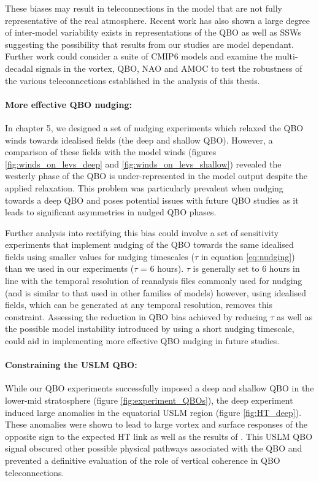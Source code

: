 These biases may result in teleconnections in the model that are not fully representative of the real atmosphere. Recent work has also shown a large degree of inter-model variability exists in representations of the QBO \citep{bushellEvaluation2020b} as well as SSWs \citep{ayarzaguenaUncertainty2020b} suggesting the possibility that results from our studies are model dependant. Further work could consider a suite of CMIP6 models and examine the multi-decadal signals in the vortex, QBO, NAO and AMOC to test the robustness of the various teleconnections established in the analysis of this thesis.   

\paragraph{More effective QBO nudging:}
In chapter 5, we designed a set of nudging experiments which relaxed the QBO winds towards idealised fields (the deep and shallow QBO). However, a comparison of these fields with the model winds (figures \ref{fig:winds_on_levs_deep} and \ref{fig:winds_on_levs_shallow}) revealed the westerly phase of the QBO is under-represented in the model output despite the applied relaxation. This problem was particularly prevalent when nudging towards a deep QBO and poses potential issues with future QBO studies as it leads to significant asymmetries in nudged QBO phases.

Further analysis into rectifying this bias could involve a set of sensitivity experiments that implement nudging of the QBO towards the same idealised fields using smaller values for nudging timescales ($\tau$ in equation \ref{eq:nudging}) than we used in our experiments ($\tau$ = 6 hours). $\tau$ is generally set to 6 hours in line with the temporal resolution of reanalysis files commonly used for nudging (and is similar to that used in other families of models) \citep{telfordTechnical2008} however, using idealised fields, which can be generated at any temporal resolution, removes this constraint. Assessing the reduction in QBO bias achieved by reducing $\tau$ as well as the possible model instability introduced by using a short nudging timescale, could aid in implementing more effective QBO nudging in future studies.

\paragraph{Constraining the USLM QBO:}
While our QBO experiments successfully imposed a deep and shallow QBO in the lower-mid stratosphere (figure \ref{fig:experiment_QBOs}), the deep experiment induced large anomalies in the equatorial USLM region (figure \ref{fig:HT_deep}). These anomalies were shown to lead to large vortex and surface responses of the opposite sign to the expected HT link as well as the results of \cite{andrewsObserved2019d}. This USLM QBO signal obscured other possible physical pathways associated with the QBO and prevented a definitive evaluation of the role of vertical coherence in QBO teleconnections. 

